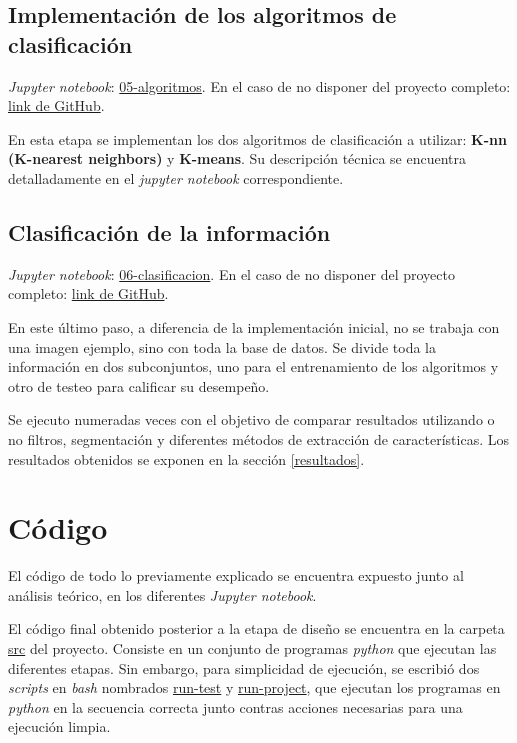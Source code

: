 \documentclass[10pt,a4paper]{article}
\begin{document}
\subsection{Implementación de los algoritmos de clasificación}
\textit{Jupyter notebook}: \href{./05-algoritmos.ipynb}{05-algoritmos}. En el caso de no disponer del proyecto completo: \href{https://github.com/FernandezGFG/fruit-classifier/blob/master/05-algoritmos.ipynb}{link de GitHub}.

En esta etapa se implementan los dos algoritmos de clasificación a utilizar: \textbf{K-nn (K-nearest neighbors)} y \textbf{K-means}. Su descripción técnica se encuentra detalladamente en el \textit{jupyter notebook} correspondiente.

\subsection{Clasificación de la información}
\textit{Jupyter notebook}: \href{./06-clasificacion.ipynb}{06-clasificacion}. En el caso de no disponer del proyecto completo: \href{https://github.com/FernandezGFG/fruit-classifier/blob/master/06-clasificacion.ipynb}{link de GitHub}.

En este último paso, a diferencia de la implementación inicial, no se trabaja con una imagen ejemplo, sino con toda la base de datos. Se divide toda la información en dos subconjuntos, uno para el entrenamiento de los algoritmos y otro de testeo para calificar su desempeño.

Se ejecuto numeradas veces con el objetivo de comparar resultados utilizando o no filtros, segmentación y diferentes métodos de extracción de características. Los resultados obtenidos se exponen en la sección \ref{resultados}.

\section{Código}
El código de todo lo previamente explicado se encuentra expuesto junto al análisis teórico, en los diferentes \textit{Jupyter notebook}.

El código final obtenido posterior a la etapa de diseño se encuentra en la carpeta \href{./src/}{src} del proyecto. Consiste en un conjunto de programas \textit{python} que ejecutan las diferentes etapas. Sin embargo, para simplicidad de ejecución, se escribió dos \textit{scripts} en \textit{bash} nombrados \href{./run-test}{run-test} y \href{./run-project}{run-project}, que ejecutan los programas en \textit{python} en la secuencia correcta junto contras acciones necesarias para una ejecución limpia.
\end{document}
